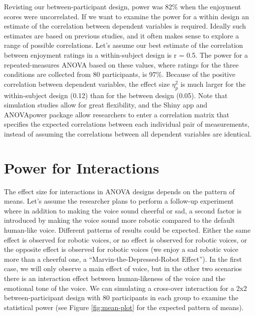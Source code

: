 \documentclass[,jou,floatsintext]{apa6}
\begin{document}
Revisting our between-participant design, power was 82\% when the enjoyment scores were uncorrelated.
If we want to examine the power for a within design an estimate of the correlation between dependent variables is required.
Ideally such estimates are based on previous studies, and it often makes sense to explore a range of possible correlations.
Let's assume our best estimate of the correlation between enjoyment ratings in a within-subject design is r = 0.5.
The power for a repeated-measures ANOVA based on these values, where ratings for the three conditions are collected from 80 participants, is 97\%.
Because of the positive correlation between dependent variables, the effect size \(\eta_p^2\) is much larger for the within-subject design (0.12) than for the between design (0.05).
Note that simulation studies allow for great flexibility, and the Shiny app and ANOVApower package allow researchers to enter a correlation matrix that specifies the expected correlations between each individual pair of measurements, instead of assuming the correlations between all dependent variables are identical.

\hypertarget{power-for-interactions}{%
\section{Power for Interactions}\label{power-for-interactions}}

The effect size for interactions in ANOVA designs depends on the pattern of means.
Let's assume the researcher plans to perform a follow-up experiment where in addition to making the voice sound cheerful or sad, a second factor is introduced by making the voice sound more robotic compared to the default human-like voice.
Different patterns of results could be expected.
Either the same effect is observed for robotic voices, or no effect is observed for robotic voices, or the opposite effect is observed for robotic voices (we enjoy a sad robotic voice more than a cheerful one, a \enquote{Marvin-the-Depressed-Robot Effect}).
In the first case, we will only observe a main effect of voice, but in the other two scenarios there is an interaction effect between human-likeness of the voice and the emotional tone of the voice.
We can simulating a cross-over interaction for a 2x2 between-participant design with 80 participants in each group to examine the statistical power (see Figure \ref{fig:mean-plot} for the expected pattern of means).
\end{document}

